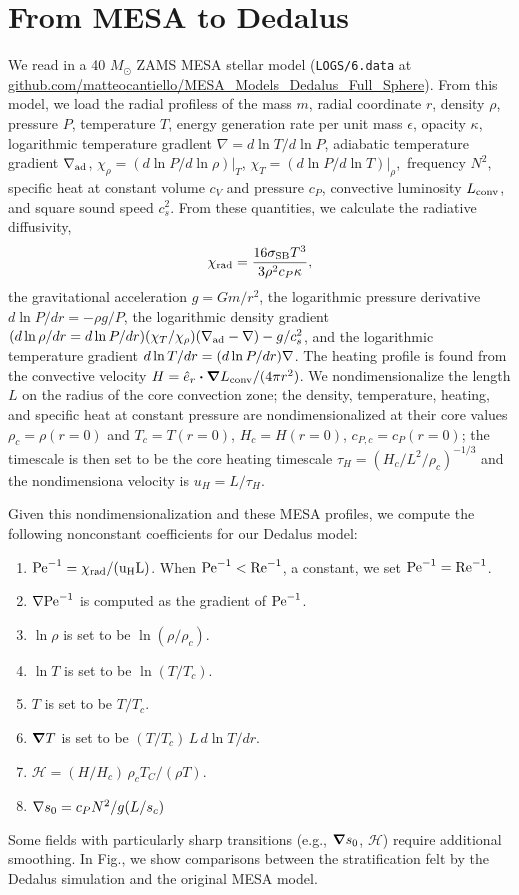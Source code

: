 \section{From MESA to Dedalus}
\label{app:mesa_dedalus}
We read in a 40 $M_\odot$ ZAMS MESA stellar model (\texttt{LOGS/6.data} at \url{github.com/matteocantiello/MESA_Models_Dedalus_Full_Sphere}).
From this model, we load the radial profiless of the mass $m$, radial coordinate $r$, density $\rho$, pressure $P$, temperature $T$, energy generation rate per unit mass $\epsilon$, opacity $\kappa$, logarithmic temperature gradlent $\nabla = d \ln T/d \ln P$, adiabatic temperature gradient $\nabla_{\rm{ad}}$, $\chi_{\rho} = (d\ln P /d\ln\rho)|_T$, $\chi_T = (d\ln P/d\ln T)|_{\rho}$, \brunt$\,$frequency $N^2$, specific heat at constant volume $c_V$ and pressure $c_P$, convective luminosity $L_{\rm{conv}}$, and square sound speed $c_s^2$.
From these quantities, we calculate the radiative diffusivity,
\begin{equation}
\chi_{\rm{rad}} = \frac{16 \sigma_{\rm{SB}} T^3}{3 \rho^2 c_P \kappa},
\end{equation}
the gravitational acceleration $g = G m / r^2$, the logarithmic pressure derivative $d\ln P/dr = - \rho g /P$, the logarithmic density gradient $(d\ln\rho/dr = d\ln P/dr)(\chi_T/\chi_{\rho})(\nabla_{\rm{ad}} - \nabla) - g/c_s^2$, and the logarithmic temperature gradient $d\ln T/dr = (d\ln P/dr)\nabla$.
The heating profile is found from the convective velocity $H = \hat{e}_r\boldsymbol{\cdot}\boldsymbol{\nabla} L_{\rm{conv}} / (4\pi r^2)$.
We nondimensionalize the length $L$ on the radius of the core convection zone; the density, temperature, heating, and specific heat at constant pressure are nondimensionalized at their core values $\rho_c = \rho(r=0)$ and $T_c = T(r=0)$, $H_c = H(r=0)$, $c_{P,c} = c_P(r=0)$; the timescale is then set to be the core heating timescale $\tau_H = (H_c / L^2 / \rho_c)^{-1/3}$ and the nondimensiona velocity is $u_H = L / \tau_H$.

Given this nondimensionalization and these MESA profiles, we compute the following nonconstant coefficients for our Dedalus model:
\begin{enumerate}
\item $\rm{Pe}^{-1} = \chi_{\rm{rad}} / (u_H L)$. When $\rm{Pe}^{-1} < \rm{Re}^{-1}$, a constant, we set $\rm{Pe}^{-1} = \rm{Re}^{-1}$.
\item $\nabla\rm{Pe}^{-1}$ is computed as the gradient of $\rm{Pe}^{-1}$.
\item $\ln\rho$ is set to be $\ln(\rho / \rho_c)$.
\item $\ln T$ is set to be $\ln(T / T_c)$.
\item $T$ is set to be $T/T_c$.
\item $\boldsymbol{\nabla} T$ is set to be $(T/T_c)\,L\,d\ln T/dr$.
\item $\mathcal{H} = (H/H_c)\, \rho_c T_C / (\rho T)$.
\item $\nabla s_0 = c_P N^2 / g (L/s_c)$
\end{enumerate}

Some fields with particularly sharp transitions (e.g., $\boldsymbol{\nabla} s_0$, $\mathcal{H}$) require additional smoothing.
In Fig., we show comparisons between the stratification felt by the Dedalus simulation and the original MESA model.

